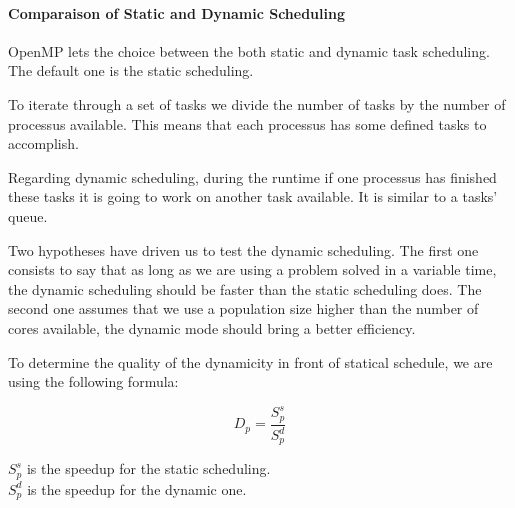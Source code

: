 \documentclass{sig-alternate}
\begin{document}
\paragraph{Comparaison of Static and Dynamic Scheduling} %

OpenMP lets the choice between the both static and dynamic task scheduling. The default one is the static scheduling.


To iterate through a set of tasks we divide the number of tasks by the number of processus available. This means that each processus has some defined tasks to accomplish.


Regarding dynamic scheduling, during the runtime if one processus has finished these tasks it is going to work on another task available. It is similar to a tasks' queue.



Two hypotheses have driven us to test the dynamic scheduling. The first one consists to say that as long as we are using a problem solved in a variable time, the dynamic scheduling should be faster than the static scheduling does. The second one assumes that we use a population size higher than the number of cores available, the dynamic mode should bring a better efficiency.


To determine the quality of the dynamicity in front of statical schedule, we are using the following formula:

$$D_p = \frac{S^s_p}{S^d_p}$$

$S^s_p$ is the speedup for the static scheduling.\\
$S^d_p$ is the speedup for the dynamic one.\\
\end{document}
